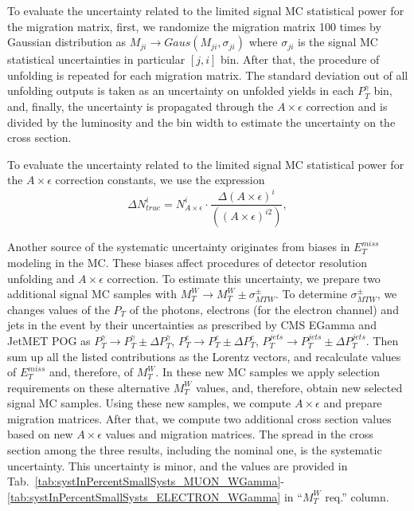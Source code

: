 To evaluate the uncertainty related to the limited signal MC statistical power for the migration matrix, first, we randomize the migration matrix 100 times by Gaussian distribution as $M_{ji}\rightarrow Gaus(M_{ji},\sigma_{ji})$ where $\sigma_{ji}$ is the signal MC statistical uncertainties in particular $[j,i]$ bin. After that, the procedure of unfolding is repeated for each migration matrix. The standard deviation out of all unfolding outputs is taken as an uncertainty on unfolded yields in each $P_T^{\gamma}$ bin, and, finally, the uncertainty is propagated through the $A\times\epsilon$ correction and is divided by the luminosity and the bin width to estimate the uncertainty on the cross section.

To evaluate the uncertainty related to the limited signal MC statistical power for the $A \times \epsilon$ correction constants, we use the expression
\begin{equation}
\Delta N_{true}^i= N_{A\times \epsilon}^i \cdot \frac{\Delta{(A\times \epsilon)^i}} { ((A\times \epsilon)^{i2})}, 
\end{equation}


Another source of the systematic uncertainty originates from biases in $E_T^{miss}$ modeling in the MC. These biases affect procedures of detector resolution unfolding and $A\times\epsilon$ correction. To estimate this uncertainty, we prepare two additional signal MC samples with $M_T^{W} \rightarrow M_T^W \pm \sigma^{\pm}_{MTW}$. To determine $\sigma^{\pm}_{MTW}$, we changes values of the $P_T$ of the photons, electrons (for the electron channel) and jets in the event by their uncertainties as prescribed by CMS EGamma and JetMET POG as $P_T^{\gamma}\rightarrow P_T^{\gamma} \pm \Delta P_T^{\gamma}$, $P_T^{e}\rightarrow P_T^{e} \pm \Delta P_T^{e}$, $P_T^{jets}\rightarrow P_T^{jets} \pm \Delta P_T^{jets}$. Then sum up all the listed contributions as the Lorentz vectors, and recalculate values of $E_T^{miss}$ and, therefore, of $M_T^{W}$. In these new MC samples we apply selection requirements on these alternative $M_T^W$ values, and, therefore, obtain new selected signal MC samples. Using these new samples, we compute $A \times \epsilon$ and prepare migration matrices. After that, we compute two additional cross section values based on new $A\times\epsilon$ values and migration matrices. The spread in the cross section among the three results, including the nominal one, is the systematic uncertainty. This uncertainty is minor, and the values are provided in Tab.~\ref{tab:systInPercentSmallSysts_MUON_WGamma}-\ref{tab:systInPercentSmallSysts_ELECTRON_WGamma} in ``$M_T^W$ req.'' column.

